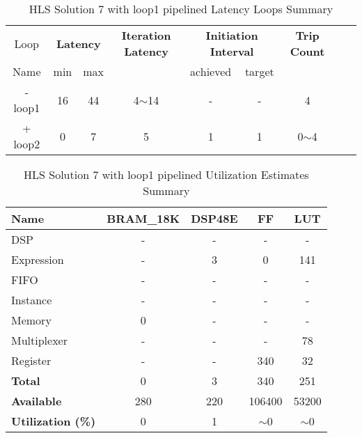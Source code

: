 \begin{table}[H]
	\centering
	\begin{tabular}{|c|c|c|c|c|c|c|c|c|}
		\hline
		\multicolumn{1}{|c|}{Loop} & \multicolumn{2}{|c|}{\textbf{Latency}} & \multicolumn{1}{c|}{\textbf{Iteration Latency}} & \multicolumn{2}{c|}{\textbf{Initiation Interval}} & \multicolumn{1}{c|}{\textbf{Trip Count}}  \\
		Name & min & max &  & achieved & target &  \\
		\hline
		- loop1 & 16 & 44 & 4$\sim$14 & - & - & 4 \\
		+ loop2 & 0 & 7 & 5 & 1 & 1 & 0$\sim$4 \\
		\hline
	\end{tabular}
	\caption{HLS Solution 7 with loop1 pipelined Latency Loops Summary}
	\label{tab:hls-solution-7-loop1-pipeline-loop-summary}
\end{table}

\begin{table}[H]
	\centering
	\begin{tabular}{|l|c|c|c|c|}
		\hline
		\textbf{Name}    & \textbf{BRAM\_18K} & \textbf{DSP48E} & \textbf{FF} & \textbf{LUT} \\ \hline
		DSP              & -                   & -               & -           & -            \\ 
		Expression       & -                   & 3              & 0           & 141          \\ 
		FIFO             & -                   & -               & -           & -            \\ 
		Instance         & -                   & -               & -           & -            \\ 
		Memory           & 0                   & -               & -          & -            \\ 
		Multiplexer      & -                   & -               & -           & 78          \\ 
		Register         & -                   & -               & 340         & 32            \\ \hline
		\textbf{Total}   & 0                   & 3               & 340         & 251          \\ \hline
		\textbf{Available} & 280               & 220             & 106400      & 53200        \\ \hline
		\textbf{Utilization (\%)} & 0            & 1               & $\sim$0     & $\sim$0      \\ \hline
	\end{tabular}
	\caption{HLS Solution 7 with loop1 pipelined Utilization Estimates Summary}
	\label{tab:hls-solution-7-loop1-pipeline-utilization-estimates-summary}
\end{table}

